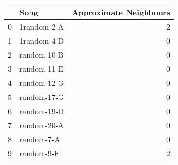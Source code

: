 \begin{tabular}{llr}
\toprule
 & Song & Approximate Neighbours \\
\midrule
0 & 1random-2-A & 2 \\
1 & 1random-4-D & 0 \\
2 & random-10-B & 0 \\
3 & random-11-E & 0 \\
4 & random-12-G & 0 \\
5 & random-17-G & 0 \\
6 & random-19-D & 0 \\
7 & random-20-A & 0 \\
8 & random-7-A & 0 \\
9 & random-9-E & 2 \\
\bottomrule
\end{tabular}
